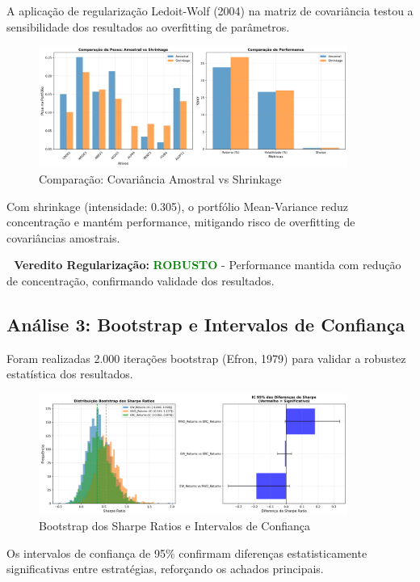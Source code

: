 A aplicação de regularização Ledoit-Wolf (2004) na matriz de covariância testou a sensibilidade dos resultados ao overfitting de parâmetros.

\begin{figure}[H]
\centering
\includegraphics[width=0.9\textwidth]{robustez/comparacao_shrinkage.png}
\caption{Comparação: Covariância Amostral vs Shrinkage}
\label{fig:shrinkage}
\end{figure}

Com shrinkage (intensidade: 0.305), o portfólio Mean-Variance reduz concentração e mantém performance, mitigando risco de overfitting de covariâncias amostrais.

\textbf{🔹 Veredito Regularização:} \textcolor{green}{\textbf{ROBUSTO}} - Performance mantida com redução de concentração, confirmando validade dos resultados.

\subsection{Análise 3: Bootstrap e Intervalos de Confiança}

Foram realizadas 2.000 iterações bootstrap (Efron, 1979) para validar a robustez estatística dos resultados.

\begin{figure}[H]
\centering
\includegraphics[width=0.9\textwidth]{robustez/bootstrap_sharpe.png}
\caption{Bootstrap dos Sharpe Ratios e Intervalos de Confiança}
\label{fig:bootstrap}
\end{figure}

Os intervalos de confiança de 95\% confirmam diferenças estatisticamente significativas entre estratégias, reforçando os achados principais.

